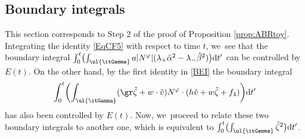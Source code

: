 \subsection{Boundary integrals}
This section corresponds to Step 2 of the proof of Proposition \ref{prop:ABRtoy}.
Integrating the identity \eqref{EqCF5} with respect to time $t$, we~see that the boundary integral
$\int_0^t \bigl(\int_{\ul{\itGamma}} a|N^\varphi|(\lambda_+\check{\alpha}^2-\lambda_-\check{\beta}^2) \bigr){\rm d}t'$ can be controlled by $E(t)$.
On the other hand, by the first identity in \eqref{BEI} the boundary integral
\[
\int_0^t\biggl(\int_{\ul{\itGamma}}(\gr\check{\zeta}+w\cdot\check{v})N^\varphi\cdot(h\check{v}+w\check{\zeta}+f_4) \biggr){\rm d}t'
\]
has also been controlled by $E(t)$.
Now, we~proceed to relate these two boundary integrals to another one, which is equivalent to
$\int_0^t \bigl(\int_{\ul{\itGamma}}\check{\zeta}^2 \bigr){\rm d}t'$.

